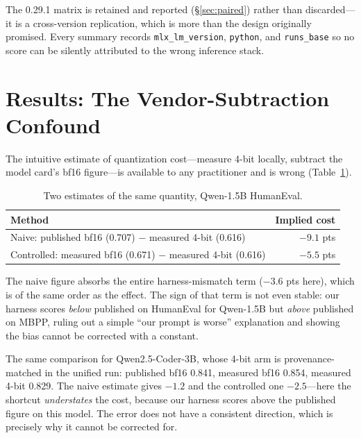 \documentclass[11pt]{article}
\begin{document}
The 0.29.1 matrix is retained and reported (\S\ref{sec:paired}) rather than discarded---it
is a cross-version replication, which is more than the design originally promised. Every
summary records \texttt{mlx\_lm\_version}, \texttt{python}, and \texttt{runs\_base} so no
score can be silently attributed to the wrong inference stack.

\section{Results: The Vendor-Subtraction Confound}
\label{sec:vendorsub}

The intuitive estimate of quantization cost---measure 4-bit locally, subtract the model
card's bf16 figure---is available to any practitioner and is wrong
(Table~\ref{tab:vendorsub}).

\begin{table}[h]
  \centering
  \caption{Two estimates of the same quantity, Qwen-1.5B HumanEval.}
  \label{tab:vendorsub}
  \smallskip
  \begin{tabular}{lr}
    \toprule
    Method & Implied cost \\
    \midrule
    Naive: published bf16 (0.707) $-$ measured 4-bit (0.616)   & $\mathbf{-9.1}$ pts \\
    Controlled: measured bf16 (0.671) $-$ measured 4-bit (0.616) & $\mathbf{-5.5}$ pts \\
    \bottomrule
  \end{tabular}
\end{table}

The naive figure absorbs the entire harness-mismatch term ($-3.6$ pts here), which is of
the same order as the effect. The sign of that term is not even stable: our harness
scores \emph{below} published on HumanEval for Qwen-1.5B but \emph{above} published on
MBPP, ruling out a simple ``our prompt is worse'' explanation and showing the bias cannot
be corrected with a constant.

The same comparison for Qwen2.5-Coder-3B, whose 4-bit arm is provenance-matched in the
unified run: published bf16 0.841, measured bf16 0.854, measured 4-bit 0.829. The naive
estimate gives $-1.2$ and the controlled one $-2.5$---here the shortcut \emph{understates}
the cost, because our harness scores above the published figure on this model. The error
does not have a consistent direction, which is precisely why it cannot be corrected for.
\end{document}
